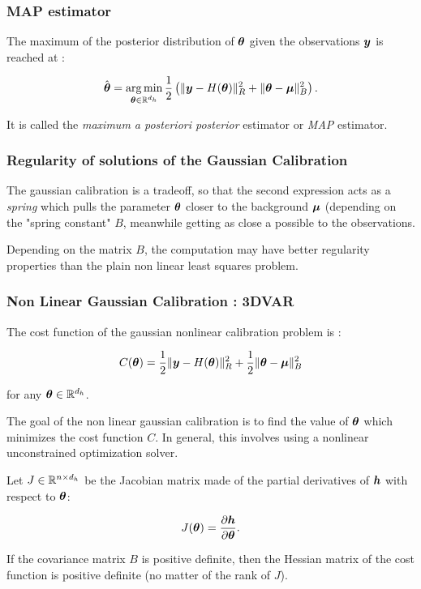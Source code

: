 \documentclass{beamer}
\begin{document}
\begin{frame}
\frametitle{MAP estimator}

The maximum of the posterior distribution of $\boldsymbol{\theta}$ given
the observations $\boldsymbol{y}$ is reached at :

$$
   \hat{\boldsymbol{\theta}} = \operatorname*{arg\,min}_{\boldsymbol{\theta}\in\mathbb{R}^{d_h}} \frac{1}{2} \left( \|\boldsymbol{y} - H(\boldsymbol{\theta})\|^2_R 
   + \|\boldsymbol{\theta}-\boldsymbol{\mu} \|^2_B \right).
$$

It is called the \emph{maximum a posteriori posterior} estimator or \emph{MAP}
estimator.
\end{frame}

\begin{frame}
\frametitle{Regularity of solutions of the Gaussian Calibration}

The gaussian calibration is a tradeoff, so that the second expression
acts as a \emph{spring} which pulls the parameter $\boldsymbol{\theta}$
closer to the background $\boldsymbol{\mu}$ (depending on the "spring
constant" $B$, meanwhile getting as close a possible to the
observations. 

Depending on the matrix $B$, the computation may
have better regularity properties than the plain non linear least
squares problem.
\end{frame}

\begin{frame}
\frametitle{Non Linear Gaussian Calibration : 3DVAR}

The cost function of the gaussian nonlinear calibration problem is :

$$
   C(\boldsymbol{\theta}) = \frac{1}{2}\|\boldsymbol{y}-H(\boldsymbol{\theta})\|^2_R 
   + \frac{1}{2}\|\boldsymbol{\theta}-\boldsymbol{\mu} \|^2_B
$$

for any $\boldsymbol{\theta}\in\mathbb{R}^{d_h}$.

The goal of the non linear gaussian calibration is to find the value of
$\boldsymbol{\theta}$ which minimizes the cost function $C$. In
general, this involves using a nonlinear unconstrained optimization
solver.

Let $J \in \mathbb{R}^{n \times d_h}$ be the Jacobian matrix made of
the partial derivatives of $\boldsymbol{h}$ with respect to
$\boldsymbol{\theta}$:

$$
J(\boldsymbol{\theta}) = \frac{\partial \boldsymbol{h}}{\partial \boldsymbol{\theta}}.
$$

If the covariance matrix $B$ is positive definite, then the
Hessian matrix of the cost function is positive definite 
(no matter of the rank of $J$). 

\end{frame}
\end{document}
